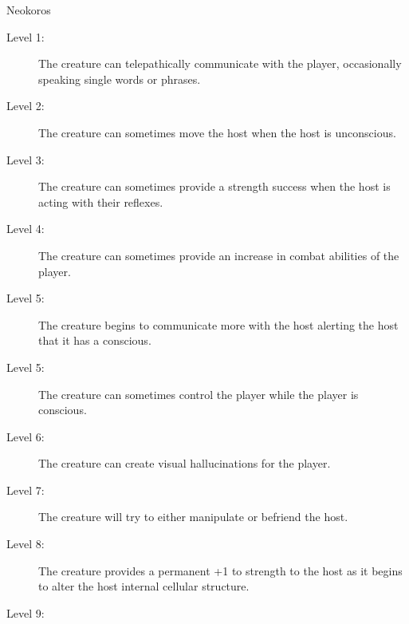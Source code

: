 \begin{commentbox}{Neokoros}
	\begin{description}
		\item[Level 1:] The creature can telepathically communicate with the player, occasionally speaking single words or phrases.
		\item[Level 2:] The creature can sometimes move the host when the host is unconscious.
		\item[Level 3:] The creature can sometimes provide a strength success when the host is acting with their reflexes. 
		\item[Level 4:] The creature can sometimes provide an increase in combat abilities of the player.
		\item[Level 5:] The creature begins to communicate more with the host alerting the host that it has a conscious.
		\item[Level 5:] The creature can sometimes control the player while the player is conscious.
		\item[Level 6:] The creature can create visual hallucinations for the player.
		\item[Level 7:] The creature will try to either manipulate or befriend the host.
		\item[Level 8:] The creature provides a permanent +1 to strength to the host as it begins to alter the host internal cellular structure.
		\item[Level 9:] 
 	\end{description}
\end{commentbox}
